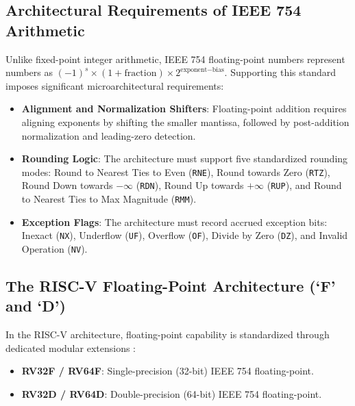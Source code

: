 \subsection{Architectural Requirements of IEEE 754 Arithmetic}
Unlike fixed-point integer arithmetic, IEEE 754 floating-point numbers represent numbers as $(-1)^s \times (1 + \text{fraction}) \times 2^{\text{exponent} - \text{bias}}$. Supporting this standard imposes significant microarchitectural requirements:
\begin{itemize}
    \item \textbf{Alignment and Normalization Shifters}: Floating-point addition requires aligning exponents by shifting the smaller mantissa, followed by post-addition normalization and leading-zero detection.
    \item \textbf{Rounding Logic}: The architecture must support five standardized rounding modes: Round to Nearest Ties to Even (\texttt{RNE}), Round towards Zero (\texttt{RTZ}), Round Down towards $-\infty$ (\texttt{RDN}), Round Up towards $+\infty$ (\texttt{RUP}), and Round to Nearest Ties to Max Magnitude (\texttt{RMM}).
    \item \textbf{Exception Flags}: The architecture must record accrued exception bits: Inexact (\texttt{NX}), Underflow (\texttt{UF}), Overflow (\texttt{OF}), Divide by Zero (\texttt{DZ}), and Invalid Operation (\texttt{NV}).
\end{itemize}

\subsection{The RISC-V Floating-Point Architecture (`F' and `D')}
In the RISC-V architecture, floating-point capability is standardized through dedicated modular extensions \cite{riscv-spec}:
\begin{itemize}
    \item \textbf{RV32F / RV64F}: Single-precision (32-bit) IEEE 754 floating-point.
    \item \textbf{RV32D / RV64D}: Double-precision (64-bit) IEEE 754 floating-point.
\end{itemize}


